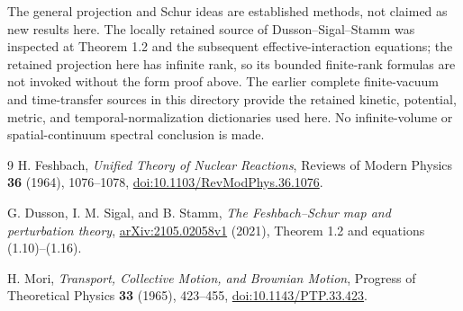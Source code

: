 \documentclass[11pt]{article}
\begin{document}
The general projection and Schur ideas are established methods, not
claimed as new results here. The locally retained source of
Dusson--Sigal--Stamm was inspected at Theorem 1.2 and the subsequent
effective-interaction equations; the retained projection here has
infinite rank, so its bounded finite-rank formulas are not invoked
without the form proof above. The earlier complete finite-vacuum and
time-transfer sources in this directory provide the retained kinetic,
potential, metric, and temporal-normalization dictionaries used here.
No infinite-volume or spatial-continuum spectral conclusion is made.

\begin{thebibliography}{9}
H. Feshbach, \emph{Unified Theory of Nuclear Reactions},
Reviews of Modern Physics \textbf{36} (1964), 1076--1078,
\href{https://doi.org/10.1103/RevModPhys.36.1076}
{doi:10.1103/RevModPhys.36.1076}.

G. Dusson, I. M. Sigal, and B. Stamm,
\emph{The Feshbach--Schur map and perturbation theory},
\href{https://arxiv.org/abs/2105.02058}{arXiv:2105.02058v1} (2021),
Theorem 1.2 and equations (1.10)--(1.16).

H. Mori, \emph{Transport, Collective Motion, and Brownian Motion},
Progress of Theoretical Physics \textbf{33} (1965), 423--455,
\href{https://doi.org/10.1143/PTP.33.423}{doi:10.1143/PTP.33.423}.
\end{thebibliography}
\end{document}
